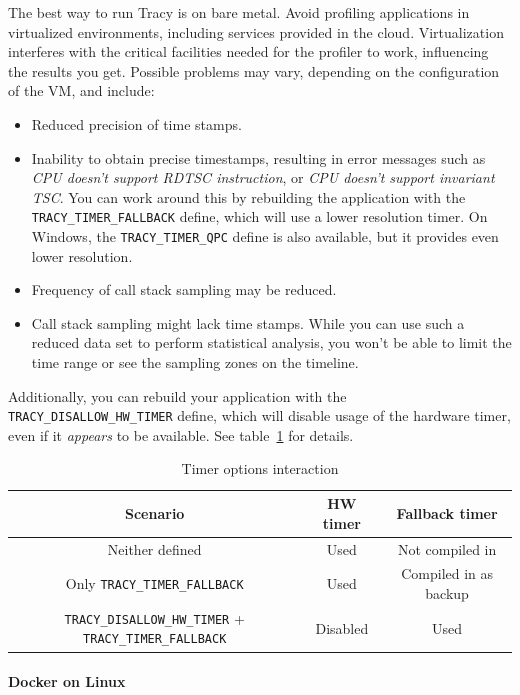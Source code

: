 \documentclass[hidelinks,titlepage,a4paper,twoside]{article}
\begin{document}
The best way to run Tracy is on bare metal. Avoid profiling applications in virtualized environments, including services provided in the cloud. Virtualization interferes with the critical facilities needed for the profiler to work, influencing the results you get. Possible problems may vary, depending on the configuration of the VM, and include:

\begin{itemize}
\item Reduced precision of time stamps.
\item Inability to obtain precise timestamps, resulting in error messages such as \emph{CPU doesn't support RDTSC instruction}, or \emph{CPU doesn't support invariant TSC}. You can work around this by rebuilding the application with the \texttt{TRACY\_TIMER\_FALLBACK} define, which will use a lower resolution timer. On Windows, the \texttt{TRACY\_TIMER\_QPC} define is also available, but it provides even lower resolution.
\item Frequency of call stack sampling may be reduced.
\item Call stack sampling might lack time stamps. While you can use such a reduced data set to perform statistical analysis, you won't be able to limit the time range or see the sampling zones on the timeline.
\end{itemize}

Additionally, you can rebuild your application with the \texttt{TRACY\_DISALLOW\_HW\_TIMER} define, which will disable usage of the hardware timer, even if it \emph{appears} to be available. See table~\ref{timeroptions} for details.

\begin{table}[h]
\centering
\begin{tabular}{|c|c|c|}
\hline
\textbf{Scenario} & \textbf{HW timer} & \textbf{Fallback timer} \\ \hline
Neither defined & Used & Not compiled in \\ \hline
Only \texttt{TRACY\_TIMER\_FALLBACK} & Used & Compiled in as backup \\ \hline
\texttt{TRACY\_DISALLOW\_HW\_TIMER} + \texttt{TRACY\_TIMER\_FALLBACK} & Disabled & Used \\ \hline
\end{tabular}
\caption{Timer options interaction}
\label{timeroptions}
\end{table}

\paragraph{Docker on Linux}
\end{document}
